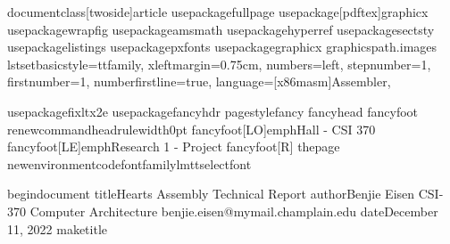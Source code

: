 documentclass[twoside]{article}
usepackage{fullpage}
usepackage[pdftex]{graphicx}
usepackage{wrapfig}
usepackage{amsmath}
usepackage{hyperref}
usepackage{sectsty}
usepackage{listings}
usepackage{pxfonts}
usepackage{graphicx}
graphicspath{{.images}}
lstset{basicstyle={ttfamily},
xleftmargin={0.75cm},
numbers=left,
stepnumber=1,
firstnumber=1,
numberfirstline=true,
language={[x86masm]Assembler},
}

usepackage{fixltx2e}
usepackage{fancyhdr}
pagestyle{fancy}
fancyhead{}
fancyfoot{}
renewcommand{headrulewidth}{0pt}
fancyfoot[LO]{emph{Hall - CSI 370}}
fancyfoot[LE]{emph{Research 1 - Project}}
fancyfoot[R] {thepage}
newenvironment{code}{fontfamily{lmtt}selectfont}{}

begin{document}
title{Hearts Assembly Technical Report}
author{Benjie Eisen 
CSI-370 Computer Architecture
benjie.eisen@mymail.champlain.edu}
date{December 11, 2022}
maketitle

